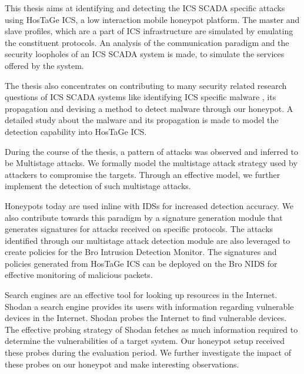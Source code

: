 \documentclass[article,msc=informatik,type=msc,colorback,accentcolor=tud9c]{tudthesis}
\begin{document}
   This thesis aims at identifying and detecting the \ac{ICS} \ac{SCADA} specific attacks using HosTaGe \ac{ICS}, a low interaction mobile honeypot platform. The master and slave profiles, which are a part of \ac{ICS} infrastructure are simulated by emulating the constituent protocols. An analysis of the communication paradigm and the security loopholes of an  \ac{ICS} \ac{SCADA} system is made, to simulate the services offered by the system.   
  
  
  \vspace{3mm} 
   The thesis also concentrates on contributing to many security related research questions of  \ac{ICS} \ac{SCADA} systems like identifying \ac{ICS} specific malware , its propagation and devising a method to detect malware through our honeypot. A detailed study about the malware and its propagation is made to model the detection capability into HosTaGe ICS. 
   
   
   \vspace{3mm}
   During the course of the thesis, a pattern of attacks was observed and inferred to be Multistage attacks. We formally model the multistage attack strategy used by attackers to compromise the targets. Through an effective model, we further implement the detection of such multistage attacks. 
   
   
   \vspace{3mm}
   Honeypots today are used inline with \ac{IDS}s for increased detection accuracy. We also contribute towards this paradigm by a signature generation module that generates signatures for attacks received on specific protocols. The attacks identified through our multistage attack detection module are also leveraged to create policies for the Bro Intrusion Detection Monitor. The signatures and policies generated from HosTaGe ICS can be deployed on the Bro \ac{NIDS} for effective monitoring of malicious packets.   
   
   
      \vspace{3mm}
   Search engines are an effective tool for looking up resources in the Internet. Shodan a search engine provides its users with information regarding vulnerable devices in the Internet. Shodan probes the Internet to find vulnerable devices. The effective probing strategy of Shodan fetches as much information required to determine the vulnerabilities of a target system. Our honeypot setup received these probes during the evaluation period. We further investigate the impact of these probes on our honeypot and make interesting observations.
   
\end{document}
